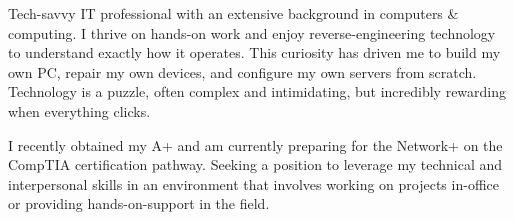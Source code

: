 
\begin{cvparagraph}
Tech-savvy IT professional with an extensive background in computers \& computing. I thrive on hands-on work and enjoy reverse-engineering technology to understand exactly how it operates. This curiosity has driven me to build my own PC, repair my own devices, and configure my own servers from scratch. Technology is a puzzle, often complex and intimidating, but incredibly rewarding when everything clicks.

I recently obtained my A+ and am currently preparing for the Network+ on the CompTIA certification pathway. Seeking a position to leverage my technical and interpersonal skills in an environment that involves working on projects in-office or providing hands-on-support in the field.
\end{cvparagraph}
